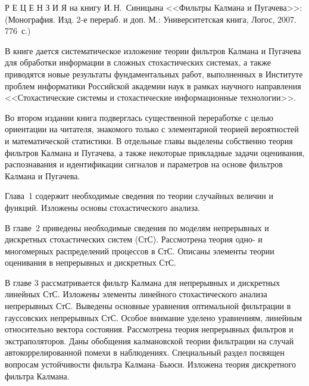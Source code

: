     Р Е Ц Е Н З И Я
     на книгу И.\,Н.~Синицына <<Фильтры Калмана и Пугачева>>: 
      (Монография. Изд. 2-е перераб. и доп. М.: Университетская книга, Логос, 2007. 
776~с.)
       
       
     В книге дается систематическое изложение теории фильтров Калмана и 
Пугачева для обработки информации в сложных стохастических системах, а также 
приводятся новые результаты фундаментальных работ, выполненных в Институте 
проблем информатики Российской академии наук в рамках научного направления 
<<Стохастические системы и стохастические информационные технологии>>. 
     
     Во втором издании книга подверглась существенной переработке с целью 
ориентации на читателя, знакомого только с элементарной теорией вероятностей и 
математической статистики. В отдельные главы выделены собственно теория 
фильтров Калмана и Пугачева, а также некоторые прикладные задачи оценивания, 
распознавания и идентификации сигналов и параметров на основе фильтров Калмана 
и Пугачева. 
     
     Глава~1 содержит необходимые сведения по теории случайных величин и 
функций. Изложены основы стохастического анализа.
     
     В главе~2 приведены необходимые сведения по моделям непрерывных и 
дискретных стохастических систем (СтС). Рассмотрена теория одно- и многомерных 
распределений процессов в СтС. Описаны элементы теории оценивания в 
непрерывных и дискретных СтС.
     
     В главе 3 рассматривается фильтр Калмана для непрерывных и дискретных 
линейных СтС. Изложены элементы линейного стохастического анализа 
непрерывных СтС. Выведены основные уравнения оптимальной фильтрации в 
гауссовских непрерывных СтС. Особое внимание уделено уравнениям, линейным 
относительно вектора состояния. Рассмотрена теория непрерывных фильтров и 
экстраполяторов. Даны обобщения калмановской теории фильтрации на случай 
автокоррелированной помехи в наблюдениях. Специальный раздел посвящен 
вопросам устойчивости фильтра Калмана--Бьюси. Изложена теория дискретного 
фильтра Калмана.
     
